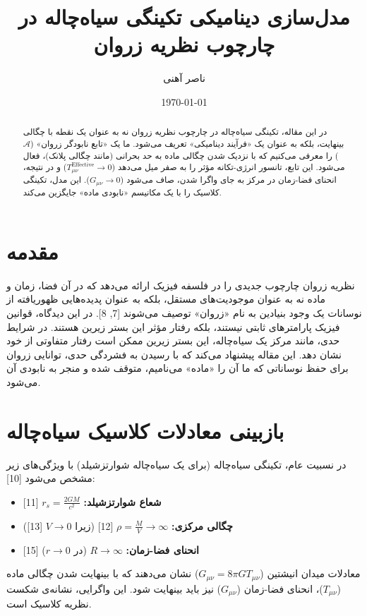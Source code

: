 \documentclass[12pt,a4paper]{article}
\title{مدل‌سازی دینامیکی تکینگی سیاه‌چاله در چارچوب نظریه زروان}
\author{ناصر آهنی}
\date{\today}
\begin{document}
\maketitle

\begin{abstract}
در این مقاله، تکینگی سیاه‌چاله در چارچوب نظریه زروان نه به عنوان یک نقطه با چگالی بینهایت، بلکه به عنوان یک «فرآیند دینامیکی» تعریف می‌شود. ما یک «تابع نابودگر زروان» ($\mathcal{A}$) را معرفی می‌کنیم که با نزدیک شدن چگالی ماده به حد بحرانی (مانند چگالی پلانک)، فعال می‌شود. این تابع، تانسور انرژی-تکانه مؤثر را به صفر میل می‌دهد ($T_{\mu\nu}^{\text{Effective}} \to 0$) و در نتیجه، انحنای فضا-زمان در مرکز به جای واگرا شدن، صاف می‌شود ($G_{\mu\nu} \to 0$). این مدل، تکینگی کلاسیک را با یک مکانیسم «نابودی ماده» جایگزین می‌کند.
\end{abstract}

\newpage

\section{مقدمه}
نظریه زروان چارچوب جدیدی را در فلسفه فیزیک ارائه می‌دهد که در آن فضا، زمان و ماده نه به عنوان موجودیت‌های مستقل، بلکه به عنوان پدیده‌هایی ظهوریافته از نوسانات یک وجود بنیادین به نام «زروان» توصیف می‌شوند [7, 8]. در این دیدگاه، قوانین فیزیک پارامترهای ثابتی نیستند، بلکه رفتار مؤثر این بستر زیرین هستند. در شرایط حدی، مانند مرکز یک سیاه‌چاله، این بستر زیرین ممکن است رفتار متفاوتی از خود نشان دهد. این مقاله پیشنهاد می‌کند که با رسیدن به فشردگی حدی، توانایی زروان برای حفظ نوساناتی که ما آن را «ماده» می‌نامیم، متوقف شده و منجر به نابودی آن می‌شود.

\section{بازبینی معادلات کلاسیک سیاه‌چاله}
در نسبیت عام، تکینگی سیاه‌چاله (برای یک سیاه‌چاله شوارتزشیلد) با ویژگی‌های زیر مشخص می‌شود [10]:
\begin{itemize}
    \item \textbf{شعاع شوارتزشیلد:} $r_{s} = \frac{2GM}{c^{2}}$ [11]
    \item \textbf{چگالی مرکزی:} $\rho = \frac{M}{V} \to \infty$ [12] (زیرا $V \to 0$ [13])
    \item \textbf{انحنای فضا-زمان:} $R \to \infty$ (در $r \to 0$) [15]
\end{itemize}
معادلات میدان انیشتین ($G_{\mu\nu} = 8\pi G T_{\mu\nu}$) نشان می‌دهند که با بینهایت شدن چگالی ماده ($T_{\mu\nu}$)، انحنای فضا-زمان ($G_{\mu\nu}$) نیز باید بینهایت شود. این واگرایی، نشانه‌ی شکست نظریه کلاسیک است.
\end{document}

